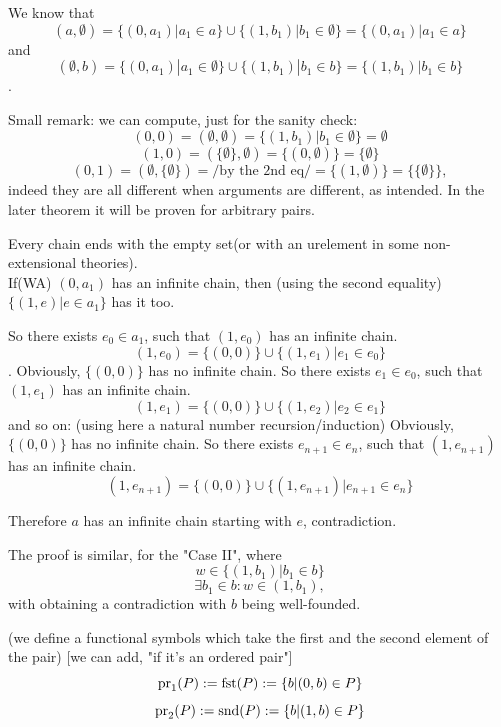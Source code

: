 
We know that
\[
(a,\emptyset) = \{(0,a_1)|a_1\in a\}\cup \{(1,b_1)|b_1\in \emptyset\} = \{(0,a_1)|a_1\in a\}
\]
and
\[
(\emptyset,b) = \{(0,a_1)|a_1\in \emptyset\}\cup \{(1,b_1)|b_1\in b\} = \{(1,b_1)|b_1\in b\}
\]
.

Small remark: we can compute, just for the sanity check:
\[
(0,0) = (\emptyset,\emptyset) = \{(1,b_1)|b_1\in \emptyset\} = \emptyset
\]
\[
(1,0) = (\{\emptyset\},\emptyset) = \{(0,\emptyset)\} = \{\emptyset\}
\]
\[
(0,1) = (\emptyset,\{\emptyset\}) =/\mbox{by the 2nd eq}/= \{(1,\emptyset)\} = \{\{\emptyset\}\},
\]
indeed they are all different when arguments are different, as intended. In the later theorem it will be proven for arbitrary pairs.

Every chain ends with the empty set(or with an urelement in some non-extensional theories).\\

If(WA) $(0,a_1)$ has an infinite chain, then (using the second equality) 
$\{(1,e)|e\in a_1\}$ has it too. 

So there exists $e_0\in a_1$, such that $(1,e_0)$ has an infinite chain.
\[
(1,e_0) = \{(0,0)\}\cup \{(1,e_1)|e_1\in e_0\}
\]
.
Obviously, $\{(0,0)\}$ has no infinite chain. So there exists $e_1\in e_0$, such that $(1,e_1)$ has an infinite chain.
\[
(1,e_1) = \{(0,0)\}\cup \{(1,e_2)|e_2\in e_1\}
\]
and so on: (using here a natural number recursion/induction)
Obviously, $\{(0,0)\}$ has no infinite chain. So there exists $e_{n+1}\in e_{n}$, such that $(1,e_{n+1})$ has an infinite chain.
\[
(1,e_{n+1}) = \{(0,0)\}\cup \{(1,e_{n+1})|e_{n+1}\in e_n\}
\]

Therefore $a$ has an infinite chain starting with $e$, contradiction.

The proof is similar, for the "Case II", where
\[
w\in \{(1,b_1)|b_1\in b\}
\]
\[
\exists b_1\in b: w\in (1,b_1),
\]
with obtaining a contradiction with $b$ being well-founded.\\
\Done

\begin{definition}(we define a functional symbols which take the first and the second element of the pair) [we can add, "if it's an ordered pair"]
\[
\mathrm{pr}_1(P) := \mathrm{fst}(P) := \{b|(0,b)\in P\}
\]
\[
\mathrm{pr}_2(P) := \mathrm{snd}(P) := \{b|(1,b)\in P\}
\]
\end{definition}

